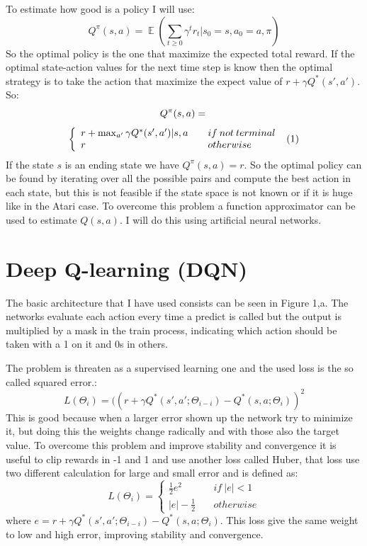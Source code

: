 \documentclass[10pt]{article}
\newcommand\inlineeqno{\stepcounter{equation}\ (\theequation)}
\newcommand{\expect}{\mathop{\mathbb{E}}\nolimits}
\begin{document}
\begin{multicols}{2}
To estimate how good is a policy I will use: 
\[
Q^\pi(s, a) =\expect(\sum_{t\ge0} \gamma^tr_t|s_0 = s, a_0 = a, \pi )
\]
So the optimal policy is the one that maximize the expected total reward.  If the optimal state-action values for the next time step is know then the optimal strategy is to take the action that maximize the expect value of $r + \gamma Q^*(s', a')$. So: 
\[
Q^\pi(s, a)=\\
\]
\[ \left\{
\begin{array}{ll}
r+ \max_{a'} \gamma Q^* (s', a')|s, a & \quad	  if \: not \: terminal \\
r & \quad otherwise
\end{array}
\right. \inlineeqno
\] 
 If the state $s$ is an ending state we have $Q^\pi(s, a) = r$.
So the optimal policy can be found by iterating over all the possible pairs and compute the best action in each state, but this is not feasible if the state space is not known or if it is huge like in the Atari case. To overcome this problem a function approximator can be used to estimate $Q(s, a)$. I will do this using artificial neural networks.

\section{Deep Q-learning (DQN)}
The basic architecture that I have used consists can be seen in Figure 1,a. The networks evaluate each action every time a predict is called but the output is multiplied by a mask in the train process, indicating which action should be taken with a 1 on it and 0s in others.

The problem is threaten as a supervised learning one and the used loss is the so called squared error.: 
\[
L(\Theta_i) = ((r + \gamma Q^*(s', a';\Theta_{i-i})- Q^*(s, a;\Theta_{i} ))^2
\]
This is good because when a larger error shown up the network try to minimize it, but doing this the weights change radically and with those also the target value. To overcome this problem and improve stability and convergence it is useful to clip rewards in -1 and 1 and use another loss called Huber, that loss use two different calculation for large and small error and is defined as: 
\[
 L(\Theta_i)=\left\{
 \begin{array}{ll}
 \frac{1}{2}e^2  & \quad	  if \:|e| < 1 \\
 |e| - \frac{1}{2} & \quad otherwise
 \end{array}
 \right.
\] 
where $e = r + \gamma Q^*(s', a';\Theta_{i-i})- Q^*(s, a;\Theta_{i} )$. This loss give the same weight to low and high error, improving stability and convergence.  


\end{multicols}
\end{document}
